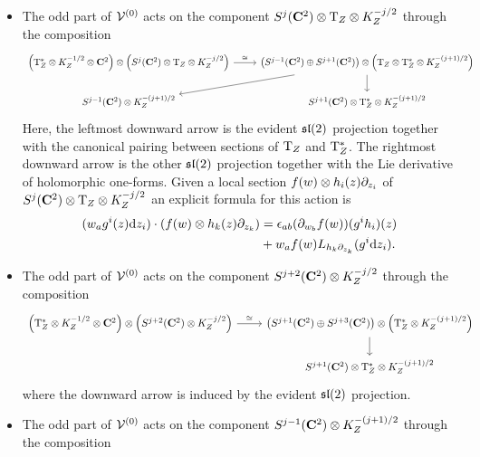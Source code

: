 \documentclass[../main.tex]{subfiles}
\begin{document}
\begin{itemize}
\item The odd part of $\mathcal{V}^{(0)}$ acts on the component $S^{j}(\mathbf{C}^2) \otimes {\mathrm{T}}_Z \otimes K^{-j/2}_Z$ through the composition
\begin{equation}
\begin{tikzcd}
\left(\T^*_Z \otimes K^{-1/2}_Z \otimes \C^2\right) \otimes \left(S^{j}(\C^2) \otimes \T_Z \otimes K^{-j/2}_Z\right) \ar[r,"\cong"] & \left(S^{j-1}(\C^2) \oplus S^{j+1}(\C^2)\right) \otimes \left(\T_Z \otimes \T^*_Z \otimes K^{-(j+1)/2}_Z\right) \ar[dl] \ar[d] \\
S^{j-1}(\C^2) \otimes K^{-(j+1)/2}_Z & S^{j+1}(\C^2) \otimes \T^*_Z \otimes K^{-(j+1)/2}_Z 
\end{tikzcd}
\end{equation}
Here, the leftmost downward arrow is the evident $\mathfrak{sl}(2)$ projection together with the canonical pairing between sections of ${\mathrm{T}}_Z$ and ${\mathrm{T}}^*_Z$.
The rightmost downward arrow is the other $\mathfrak{sl}(2)$ projection together with the Lie derivative of holomorphic one-forms.  
Given a local section $f(w) \otimes h_i(z) \partial_{z_i}$ of $S^j(\mathbf{C}^2) \otimes {\mathrm{T}}_Z \otimes K_Z^{-j/2}$ an explicit formula for this action is
\begin{align*}
(w_a g^i(z) \mathrm{d} z_i) \cdot (f(w) \otimes h_k(z) \partial_{z_k}) & = \epsilon_{ab} (\partial_{w_b} f(w)) (g^i h_i)(z)  \\ & + w_a f(w) L_{h_k \partial_{z_k}} (g^i \mathrm{d} z_i) .
\end{align*}
\item The odd part of $\mathcal{V}^{(0)}$ acts on the component $S^{j+2}(\mathbf{C}^2) \otimes K^{-j/2}_Z$ through the composition
\begin{equation}
\begin{tikzcd}
\left(\T^*_Z \otimes K^{-1/2}_Z \otimes \C^2\right) \otimes \left(S^{j+2}(\C^2) \otimes K^{-j/2}_Z\right) \ar[r,"\cong"] & \left(S^{j+1}(\C^2) \oplus S^{j+3}(\C^2)\right) \otimes \left(\T^*_Z \otimes K^{-(j+1)/2}_Z\right) \ar[d] \\
& S^{j+1}(\C^2) \otimes \T^*_Z \otimes K^{-(j+1)/2}_Z
\end{tikzcd}
\end{equation}
where the downward arrow is induced by the evident $\mathfrak{sl}(2)$ projection.
\item The odd part of $\mathcal{V}^{(0)}$ acts on the component $S^{j-1}(\mathbf{C}^2) \otimes K^{-(j+1)/2}_Z$ through the composition
\begin{equation}
\begin{tikzcd}

\end{tikzcd}
\end{equation}
\end{itemize}
\end{document}
